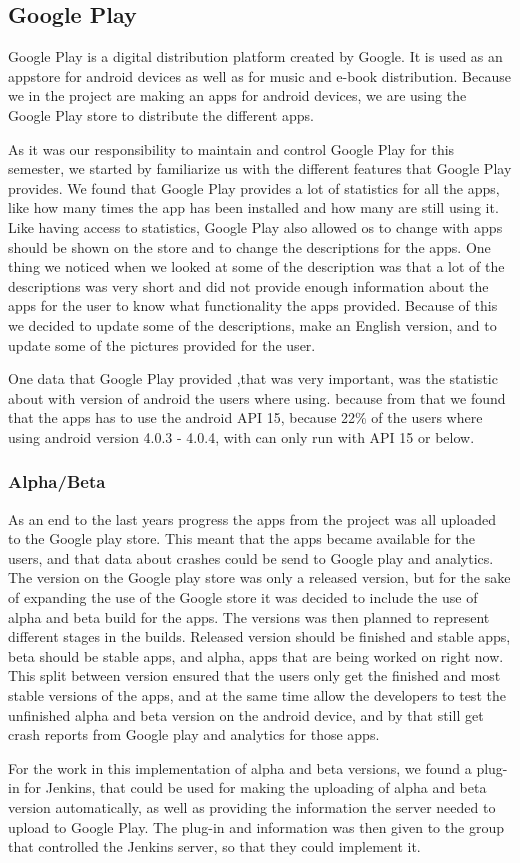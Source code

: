 \subsection{Google Play}
Google Play is a digital distribution platform created by Google. It is used as an appstore for android devices as well as for music and e-book distribution. Because we in the project are making an apps for android devices, we are using the Google Play store to distribute the different apps. 

As it was our responsibility to maintain and control Google Play for this semester, we started by familiarize us with the different features that Google Play provides. We found that Google Play provides a lot of statistics for all the apps, like how many times the app has been installed and how many are still using it. Like having access to statistics, Google Play also allowed os to change with apps should be shown on the store and to change the descriptions for the apps. One thing we noticed when we looked at some of the description was that a lot of the descriptions was very short and did not provide enough information about the apps for the user to know what functionality the apps provided. Because of this we decided to update some of the descriptions, make an English version, and to update some of the pictures provided for the user.

One data that Google Play provided ,that was very important, was the statistic about with version of android the users where using. because from that we found that the apps has to use the android API 15, because 22\% of the users where using android version 4.0.3 - 4.0.4, with can only run with API 15 or below. 

\subsubsection{Alpha/Beta}
As an end to the last years progress the apps from the project was all uploaded to the Google play store. This meant that the apps became available for the users, and that data about crashes could be send to Google play and analytics. The version on the Google play store was only a released version, but for the sake of expanding the use of the Google store it was decided to include the use of alpha and beta build for the apps. The versions was then planned to represent different stages in the builds. Released version should be finished and stable apps, beta should be stable apps, and alpha, apps that are being worked on right now. This split between version ensured that the users only get the finished and most stable versions of the apps, and at the same time allow the developers to test the unfinished alpha and beta version on the android device, and by that still get crash reports from Google play and analytics for those apps.

For the work in this implementation of alpha and beta versions, we found a plug-in for Jenkins, that could be used for making the uploading of alpha and beta version automatically, as well as providing the information the server needed to upload to Google Play. The plug-in and information was then given to the group that controlled the Jenkins server, so that they could implement it. 